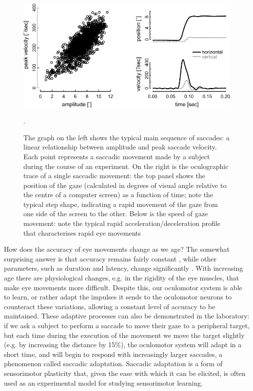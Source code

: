\documentclass[11pt]{article}
\begin{document}
\begin{figure}
\centering
\includegraphics[width=140mm]{fig2.pdf}
\caption{The graph on the left shows the typical main sequence of saccades: a linear relationship between amplitude and peak saccade velocity. Each point represents a saccadic movement made by a subject during the course of an experiment. On the right is the oculographic trace of a single saccadic movement: the top panel shows the position of the gaze (calculated in degrees of visual angle relative to the centre of a computer screen) as a function of time; note the typical step shape, indicating a rapid movement of the gaze from one side of the screen to the other. Below is the speed of gaze movement: note the typical rapid acceleration/deceleration profile that characterises rapid eye movements}.
\label{fig2}
\end{figure}


How does the accuracy of eye movements change as we age? The somewhat surprising answer is that accuracy remains fairly constant \cite{Warabi1984}, while other parameters, such as duration and latency, change significantly \cite{Munoz1998}. With increasing age there are physiological changes, e.g. in the rigidity of the eye muscles, that make eye movements more difficult. Despite this, our oculomotor system is able to learn, or rather adapt the impulses it sends to the oculomotor neurons to counteract these variations, allowing a constant level of accuracy to be maintained. These adaptive processes can also be demonstrated in the laboratory: if we ask a subject to perform a saccade to move their gaze to a peripheral target, but each time during the execution of the movement we move the target slightly (e.g. by increasing the distance by 15\%), the oculomotor system will adapt in a short time, and will begin to respond with increasingly larger saccades, a phenomenon called saccadic adaptation\cite{McLaughlin1967}. Saccadic adaptation is a form of sensorimotor plasticity that, given the ease with which it can be elicited, is often used as an experimental model for studying sensorimotor learning.
\end{document}
